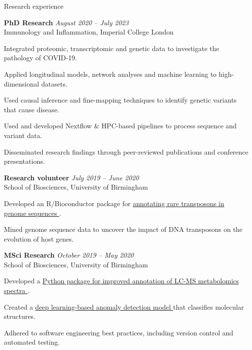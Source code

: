 \documentclass{resume}
\begin{document}
\begin{rSection}{Research experience}

\vspace{1pt plus 1pt}

\textbf{PhD Research} \hfill \textit{August 2020 -- July 2023} \\
Immunology and Inflammation, Imperial College London

\vspace{2pt plus 1pt minus 1pt}
\item Integrated proteomic, transcriptomic and genetic data to investigate the pathology of COVID-19.
\item Applied longitudinal models, network analyses and machine learning to high-dimensional datasets.
\item Used causal inference and fine-mapping techniques to identify genetic variants that cause disease.
\item Used and developed Nextflow \& HPC-based pipelines to process sequence and variant data.
\item Disseminated research findings through peer-reviewed publications and conference presentations. 

\textbf{Research volunteer} \hfill \textit{July 2019 -- June 2020} \\
School of Biosciences, University of Birmingham

\vspace{2pt plus 1pt minus 1pt}
\item Developed an R/Bioconductor package for \href{https://bioconductor.org/packages/release/bioc/html/packFinder.html}{annotating rare transposons in genome sequences \faGithub}.
\item Mined genome sequence data to uncover the impact of DNA transposons on the evolution of host genes.

\textbf{MSci Research} \hfill \textit{October 2019 -- May 2020} \\
School of Biosciences, University of Birmingham

\vspace{2pt plus 1pt minus 1pt}
\item Developed a \href{https://github.com/jackgisby/metaboblend}{Python package for improved annotation of LC-MS metabolomics spectra \faGithub}.
\item Created a \href{https://github.com/jackgisby/deepmet}{deep learning-based anomaly detection model \faGithub} that classifies molecular structures.
\item Adhered to software engineering best practices, including version control and automated testing.


\end{rSection}
\end{document}
